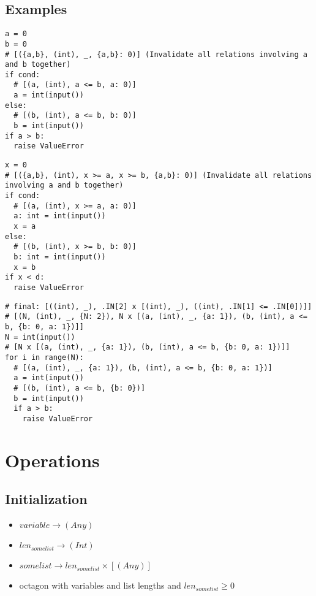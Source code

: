 \documentclass[11pt]{article}
\begin{document}
\subsection{Examples}

\begin{lstlisting}
a = 0
b = 0
# [({a,b}, (int), _, {a,b}: 0)] (Invalidate all relations involving a and b together)
if cond:
  # [(a, (int), a <= b, a: 0)]
  a = int(input())
else:
  # [(b, (int), a <= b, b: 0)]
  b = int(input())
if a > b:
  raise ValueError
\end{lstlisting}

\begin{lstlisting}
x = 0
# [({a,b}, (int), x >= a, x >= b, {a,b}: 0)] (Invalidate all relations involving a and b together)
if cond:
  # [(a, (int), x >= a, a: 0)]
  a: int = int(input())
  x = a
else:
  # [(b, (int), x >= b, b: 0)]
  b: int = int(input())
  x = b
if x < d:
  raise ValueError
\end{lstlisting}

\begin{lstlisting}
# final: [((int), _), .IN[2] x [(int), _), ((int), .IN[1] <= .IN[0])]]
# [(N, (int), _, {N: 2}), N x [(a, (int), _, {a: 1}), (b, (int), a <= b, {b: 0, a: 1})]]
N = int(input())
# [N x [(a, (int), _, {a: 1}), (b, (int), a <= b, {b: 0, a: 1})]]
for i in range(N):
  # [(a, (int), _, {a: 1}), (b, (int), a <= b, {b: 0, a: 1})]
  a = int(input())
  # [(b, (int), a <= b, {b: 0})]
  b = int(input())
  if a > b:
    raise ValueError
\end{lstlisting}


\section{Operations}

\subsection{Initialization}


\begin{itemize}
  \item $variable \rightarrow (Any)$
  \item $len_{somelist} \rightarrow (Int)$
  \item $somelist \rightarrow len_{somelist} \times [(Any)]$
  \item octagon with variables and list lengths and $len_{somelist} \geq 0$
\end{itemize}
\end{document}
